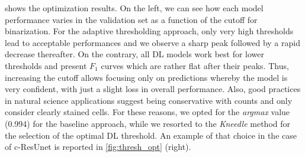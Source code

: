  shows the optimization results. On the left, we can see how each model performance varies in the validation set as a function of the cutoff for binarization.
For the adaptive thresholding approach, only very high thresholds lead to acceptable performances and we observe a sharp peak followed by a rapid decrease thereafter.
On the contrary, all DL models work best for lower thresholds and present $F_1$ curves which are rather flat after their peaks.
Thus, increasing the cutoff allows focusing only on predictions whereby the model is very confident, with just a slight loss in overall performance.
Also, good practices in natural science applications suggest being conservative with counts and only consider clearly stained cells.
For these reasons, we opted for the \textit{argmax} value (0.994) for the baseline approach, while we resorted to the \textit{Kneedle} method \cite{kneedle} for the selection of the optimal DL threshold. 
An example of that choice in the case of c-ResUnet is reported in \cref{fig:thresh_opt} (right).